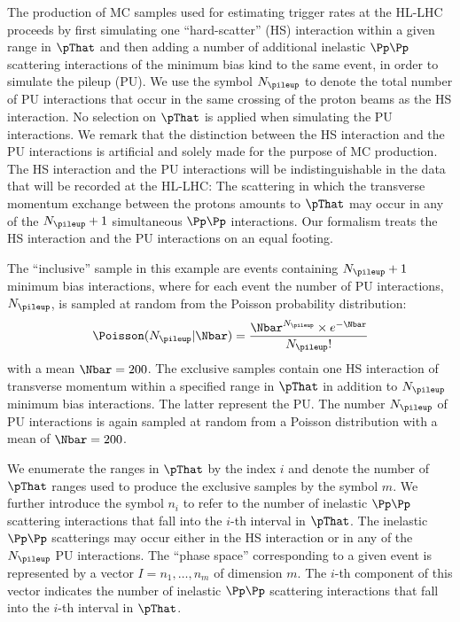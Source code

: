 The production of MC samples used for estimating trigger rates at the HL-LHC
proceeds by first simulating one ``hard-scatter'' (HS) interaction within a given range in $\pThat$
and then adding a number of additional inelastic $\Pp\Pp$ scattering interactions of the minimum bias kind to the same event,
in order to simulate the pileup (PU).
We use the symbol $N_{\pileup}$ to denote the total number of PU interactions 
that occur in the same crossing of the proton beams as the HS interaction.
No selection on $\pThat$ is applied when simulating the PU interactions.
We remark that the distinction between the HS interaction and the PU interactions is artificial and solely made for the purpose of MC production.
The HS interaction and the PU interactions will be indistinguishable in the data that will be recorded at the HL-LHC:
The scattering in which the transverse momentum exchange between the protons amounts to $\pThat$ may occur in any of the $N_{\pileup} + 1$ simultaneous $\Pp\Pp$ interactions.
Our formalism treats the HS interaction and the PU interactions on an equal footing.

The ``inclusive'' sample in this example are events containing $N_{\pileup} + 1$ minimum bias interactions,
where for each event the number of PU interactions, $N_{\pileup}$, is sampled at random from the Poisson probability distribution:
\begin{equation}
\Poisson(N_{\pileup} \vert \Nbar) = \frac{\Nbar^{N_{\pileup}} \times e^{-\Nbar}}{N_{\pileup}!}
\label{eq:Poisson}
\end{equation}
with a mean $\Nbar = 200$.
The exclusive samples contain one HS interaction of transverse momentum within a specified range in $\pThat$ in addition to $N_{\pileup}$ minimum bias interactions.
The latter represent the PU.
The number $N_{\pileup}$ of PU interactions is again sampled at random from a Poisson distribution with a mean of $\Nbar = 200$.

We enumerate the ranges in $\pThat$ by the index $i$ and denote the number of $\pThat$ ranges used to produce the exclusive samples by the symbol $m$.
We further introduce the symbol $n_{i}$ to refer to the number of inelastic $\Pp\Pp$ scattering interactions that fall into the $i$-th interval in $\pThat$.
The inelastic $\Pp\Pp$ scatterings may occur either in the HS interaction or in any of the $N_{\pileup}$ PU interactions.
The ``phase space'' corresponding to a given event is represented by a vector $I=n_{1},\dots,n_{m}$ of dimension $m$.
The $i$-th component of this vector indicates the number of inelastic $\Pp\Pp$ scattering interactions that fall into the $i$-th interval in $\pThat$.

